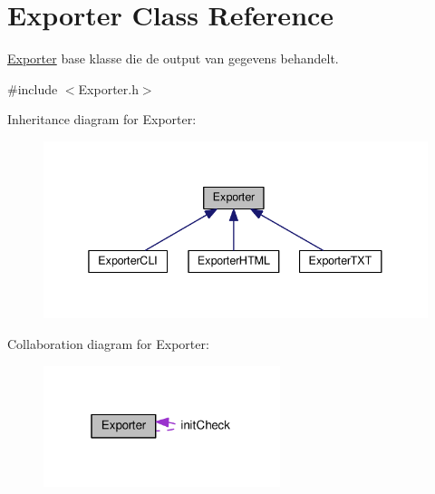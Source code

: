 \hypertarget{class_exporter}{}\section{Exporter Class Reference}
\label{class_exporter}


\hyperlink{class_exporter}{Exporter} base klasse die de output van gegevens behandelt.  




{\ttfamily \#include $<$Exporter.\+h$>$}



Inheritance diagram for Exporter\+:
\nopagebreak
\begin{figure}[H]
\begin{center}
\leavevmode
\includegraphics[width=338pt]{class_exporter__inherit__graph}
\end{center}
\end{figure}


Collaboration diagram for Exporter\+:\nopagebreak
\begin{figure}[H]
\begin{center}
\leavevmode
\includegraphics[width=196pt]{class_exporter__coll__graph}
\end{center}
\end{figure}
